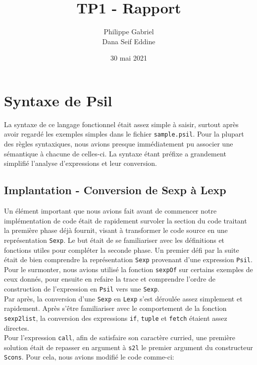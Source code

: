 \documentclass[10pt, titlepage]{article}
\begin{document}
\title{{\Huge \textbf{TP1 - Rapport}}}
\author{Philippe Gabriel \\ Dana Seif Eddine}
\date{30 mai 2021}

\maketitle

\setcounter{page}{2}

\newpage

\section{Syntaxe de Psil}

La syntaxe de ce langage fonctionnel était assez simple à saisir, surtout
après avoir regardé les exemples simples dans le fichier \texttt{sample.psil}.
Pour la plupart des règles syntaxiques, nous avions presque immédiatement pu
associer une sémantique à chacune de celles-ci. La syntaxe étant préfixe a
grandement simplifié l'analyse d'expressions et leur conversion.

\subsection{Implantation - Conversion de Sexp à Lexp}

Un élément important que nous avions fait avant de commencer notre
implémentation de code était de rapidement survoler la section du code traitant
la première phase déjà fournit, visant à transformer le code source en une
représentation \texttt{Sexp}. Le but était de se familiariser avec les
définitions et fonctions utiles pour compléter la seconde phase. Un premier
défi par la suite était de bien comprendre la représentation \texttt{Sexp}
provenant d'une expression \texttt{Psil}. Pour le surmonter, nous avions
utilisé la fonction \texttt{sexpOf} sur certains exemples de ceux donnés, pour
ensuite en refaire la trace et comprendre l'ordre de construction de
l'expression en \texttt{Psil} vers une \texttt{Sexp}. \\

Par après, la conversion d'une \texttt{Sexp} en \texttt{Lexp} s'est déroulée
assez simplement et rapidement. Après s'être familiariser avec le comportement
de la fonction \texttt{sexp2list}, la conversion des expressions \texttt{if},
\texttt{tuple} et \texttt{fetch} étaient assez directes. \\
Pour l'expression \texttt{call}, afin de satisfaire son caractère curried, une
première solution était de repasser en argument à \texttt{s2l} le premier
argument du constructeur \texttt{Scons}. Pour cela, nous avions modifié le code
comme-ci:
\end{document}
